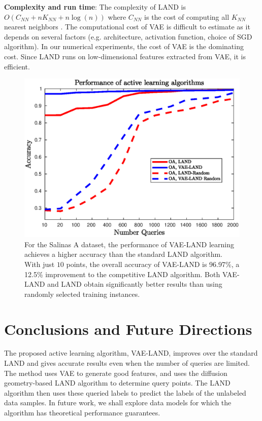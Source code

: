 \documentclass{article}
\begin{document}
\noindent \textbf{Complexity and run time}: The complexity of LAND is $O(C_{NN}+nK_{NN}+n\log(n))$ where $C_{NN}$ is the cost of computing all $K_{NN}$ nearest neighbors \cite{Maggioni2019_LAND}. 
The computational cost of VAE is difficult to estimate as it depends on several factors (e.g. architecture, activation function, choice of SGD algorithm). In our numerical experiments, the cost of VAE is the dominating cost. Since LAND runs on low-dimensional features extracted from VAE, it is efficient. 

\begin{figure}
    \includegraphics[width=.45\textwidth]{Images/salinasa_results_improved.eps}
    \caption{For the Salinas A dataset, the performance of VAE-LAND learning achieves a higher accuracy than the standard LAND algorithm. With just $10$ points, the overall accuracy of VAE-LAND is 96.97\%, a 12.5\% improvement to the competitive LAND algorithm. Both VAE-LAND and LAND obtain significantly better results than using randomly selected training instances. }
    \label{fig:my_label}
\end{figure}


\section{Conclusions and Future Directions}
\label{sec:Conclusions}
The proposed active learning algorithm, VAE-LAND, improves over the standard LAND and gives accurate results even when the number of queries are limited. The method uses VAE to generate good features, and uses the diffusion geometry-based LAND algorithm to determine query points. The LAND algorithm then uses these queried labels to predict the labels of the unlabeled data samples. In future work, we shall explore data models for which the algorithm has theoretical performance guarantees.   




\end{document}
